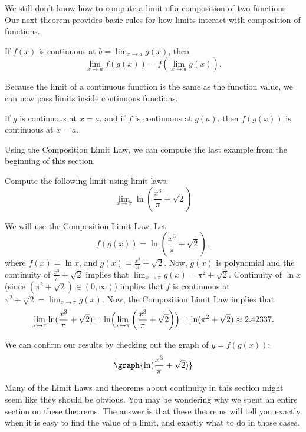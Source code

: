 \documentclass{ximera}
\begin{document}
We still don't know how to compute  a limit of a composition of two functions.
Our next theorem provides basic rules for how limits interact with composition
of functions.

\begin{theorem}
  If $f(x)$ is continuous at $b = \lim_{x\to a} g(x)$, then
  \[
  \lim_{x\to a} f(g(x)) = f(\lim_{x\to a} g(x)).
  \]
\end{theorem}

Because the limit of a continuous function is the same as the function
value, we can now pass limits inside continuous functions.

\begin{corollary}

If $g$ is continuous at $x=a$, and if $f $ is continuous at $g(a)$,  then $f(g(x))$ is continuous at $x=a$.



\end{corollary}
Using the Composition Limit Law, we can compute the last example from the beginning of this section.
\begin{example}
  Compute the following limit using limit laws:
  \[
  \lim_{x \to \pi}\ln(\frac{x^3}{\pi}+\sqrt{2})
  \]
  \begin{explanation}
  We will use the Composition Limit Law.
Let
 \[
 f(g(x))=\ln(\frac{x^3}{\pi}+\sqrt{2}),
 \]
 where $f(x)=\ln{x}$, and $g(x)=\frac{x^3}{\pi}+\sqrt{2}$.
  Now, $g(x)$ is polynomial and the continuity of $\frac{x^3}{\pi}+\sqrt{2}$ implies that $\lim_{x \to \pi}g(x)=\pi^2+\sqrt{2}$.
    Continuity of $\ln{x}$ (since $\left(\pi^2+\sqrt{2}\right)\in(0,\infty)$) implies that $f$ is continuous at $\pi^2+\sqrt{2}=\lim_{x \to \pi}g(x)$.
     Now, the Composition Limit Law implies that
    \[
    \lim_{x \to \pi}\ln(\frac{x^3}{\pi}+\sqrt{2})= \ln\Bigl({\lim_{x \to \pi} \left(\frac{x^3}{\pi}+\sqrt{2}\right)}\Bigr)=\ln({\pi^2+\sqrt{2}})\approx 2.42337.
    \]

  \begin{onlineOnly}
    We can confirm our results by checking out the graph of $y=f(g(x))$:
    \[
    \graph{\ln(\frac{x^3}{\pi}+\sqrt{2})}
    \]
  \end{onlineOnly}
  \end{explanation}
\end{example}

Many of the Limit Laws and theorems about continuity in this section
might seem like they should be obvious.  You may be wondering why we
spent an entire section on these theorems.  The answer is that these
theorems will tell you exactly when it is easy to find the value of a
limit, and exactly what to do in those cases.
\end{document}
